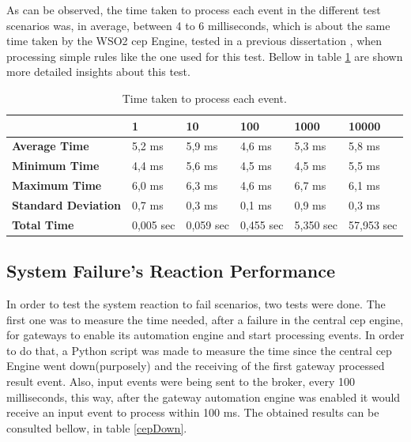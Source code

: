 As can be observed, the time taken to process each event in the different test scenarios was, in average, between 4 to 6 milliseconds, which is about the same time taken by the WSO2 \ac{cep} Engine, tested in a previous dissertation \cite{helder}, when processing simple rules like the one used for this test. Bellow in table \ref{table:event} are shown more detailed insights about this test.

\begin{table}[H]
	\begin{tabular}{l|l|l|l|l|l|}
		\cline{2-6}
		& \textbf{1} & \textbf{10} & \textbf{100} & \textbf{1000} & \textbf{10000} \\ \hline
		\multicolumn{1}{|l|}{\textbf{Average Time}}       & 5,2 ms     & 5,9 ms      & 4,6 ms       & 5,3 ms        & 5,8 ms         \\ \hline
		\multicolumn{1}{|l|}{\textbf{Minimum Time}}       & 4,4 ms     & 5,6 ms      & 4,5 ms       & 4,5 ms        & 5,5 ms         \\ \hline
		\multicolumn{1}{|l|}{\textbf{Maximum Time}}       & 6,0 ms     & 6,3 ms      & 4,6 ms       & 6,7 ms        & 6,1 ms         \\ \hline
		\multicolumn{1}{|l|}{\textbf{Standard Deviation}} & 0,7 ms     & 0,3 ms      & 0,1 ms         & 0,9 ms        & 0,3 ms         \\ \hline
		\multicolumn{1}{|l|}{\textbf{Total Time}}         & 0,005 sec  & 0,059 sec   & 0,455 sec    & 5,350 sec     & 57,953 sec     \\ \hline
	\end{tabular}
	\centering
\caption{Time taken to process each event.}
\label{table:event}
\end{table}

\subsection{System Failure's Reaction Performance}
\label{results:fail}

In order to test the system reaction to fail scenarios, two tests were done. The first one was to measure the time needed, after a failure in the central \ac{cep} engine, for gateways to enable its automation engine and start processing events. In order to do that, a Python script was made to measure the time since the central \ac{cep} Engine went down(purposely) and the receiving of the first gateway processed result event. Also, input events were being sent to the broker, every 100 milliseconds, this way, after the gateway automation engine was enabled it would receive an input event to process within 100 ms. The obtained results can be consulted bellow, in table \ref{cepDown}.


